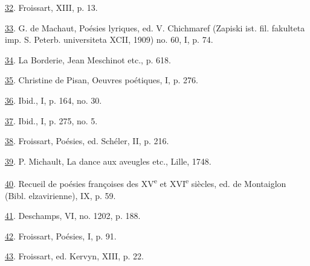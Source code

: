 \protect\hypertarget{23_NOTES.xhtmlux5cux23id_247}{\protect\hyperlink{21_Chapter_Thirteen__IMAGE_AND_WORD.xhtmlux5cux23id_246}{32}}.
Froissart, XIII, p. 13.

\protect\hypertarget{23_NOTES.xhtmlux5cux23id_245}{\protect\hyperlink{21_Chapter_Thirteen__IMAGE_AND_WORD.xhtmlux5cux23id_244}{33}}.
G. de Machaut, Poésies lyriques, ed. V. Chichmaref (Zapiski ist. fil.
fakulteta imp. S. Peterb. universiteta XCII, 1909) no. 60, I, p. 74.

\protect\hypertarget{23_NOTES.xhtmlux5cux23id_243}{\protect\hyperlink{21_Chapter_Thirteen__IMAGE_AND_WORD.xhtmlux5cux23id_242}{34}}.
La Borderie, Jean Meschinot etc., p. 618.

\protect\hypertarget{23_NOTES.xhtmlux5cux23id_241}{\protect\hyperlink{21_Chapter_Thirteen__IMAGE_AND_WORD.xhtmlux5cux23id_240}{35}}.
Christine de Pisan, Oeuvres poétiques, I, p. 276.

\protect\hypertarget{23_NOTES.xhtmlux5cux23id_239}{\protect\hyperlink{21_Chapter_Thirteen__IMAGE_AND_WORD.xhtmlux5cux23id_238}{36}}.
Ibid., I, p. 164, no. 30.

\protect\hypertarget{23_NOTES.xhtmlux5cux23id_237}{\protect\hyperlink{21_Chapter_Thirteen__IMAGE_AND_WORD.xhtmlux5cux23id_236}{37}}.
Ibid., I, p. 275, no. 5.

\protect\hypertarget{23_NOTES.xhtmlux5cux23id_235}{\protect\hyperlink{23_NOTES.xhtmlux5cux23id_235}{38}}.
Froissart, Poésies, ed. Schéler, II, p. 216.

\protect\hypertarget{23_NOTES.xhtmlux5cux23id_234}{\protect\hyperlink{21_Chapter_Thirteen__IMAGE_AND_WORD.xhtmlux5cux23id_233}{39}}.
P. Michault, La dance aux aveugles etc., Lille, 1748.

\protect\hypertarget{23_NOTES.xhtmlux5cux23id_232}{\protect\hyperlink{21_Chapter_Thirteen__IMAGE_AND_WORD.xhtmlux5cux23id_231}{40}}.
Recueil de poésies françoises des XV\textsuperscript{e} et
XVI\textsuperscript{e} siècles, ed. de Montaiglon (Bibl. elzavirienne),
IX, p. 59.

\protect\hypertarget{23_NOTES.xhtmlux5cux23id_230}{\protect\hyperlink{21_Chapter_Thirteen__IMAGE_AND_WORD.xhtmlux5cux23id_229}{41}}.
Deschamps, VI, no. 1202, p. 188.

\protect\hypertarget{23_NOTES.xhtmlux5cux23id_228}{\protect\hyperlink{21_Chapter_Thirteen__IMAGE_AND_WORD.xhtmlux5cux23id_227}{42}}.
Froissart, Poésies, I, p. 91.

\protect\hypertarget{23_NOTES.xhtmlux5cux23id_226}{\protect\hyperlink{21_Chapter_Thirteen__IMAGE_AND_WORD.xhtmlux5cux23id_225}{43}}.
Froissart, ed. Kervyn, XIII, p. 22.

